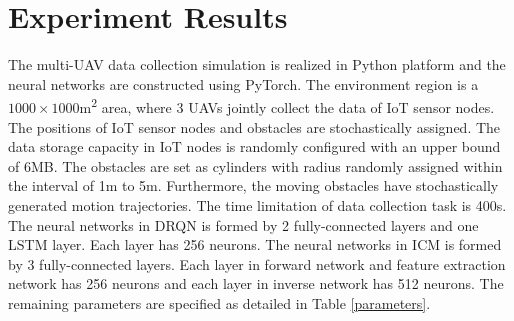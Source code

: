 \documentclass[conference]{IEEEtran}
\begin{document}
\section{Experiment Results}\label{result}
The multi-UAV data collection simulation is realized in Python platform and the neural networks are constructed using PyTorch. The environment region is a $1000\times1000$m\textsuperscript{2} area, where 3 UAVs jointly collect the data of IoT sensor nodes. The positions of IoT sensor nodes and obstacles are stochastically assigned. The data storage capacity in IoT nodes is randomly configured with an upper bound of 6MB. The obstacles are set as cylinders with radius randomly assigned within the interval of 1m to 5m. Furthermore, the moving obstacles have stochastically generated motion trajectories. The time limitation of data collection task is 400s. The neural networks in DRQN is formed by 2 fully-connected layers and one LSTM layer. Each layer has 256 neurons. The neural networks in ICM is formed by 3 fully-connected layers. Each layer in forward network and feature extraction network has 256 neurons and each layer in inverse network has 512 neurons. The remaining parameters are specified as detailed in Table \ref{parameters}. 
\end{document}

